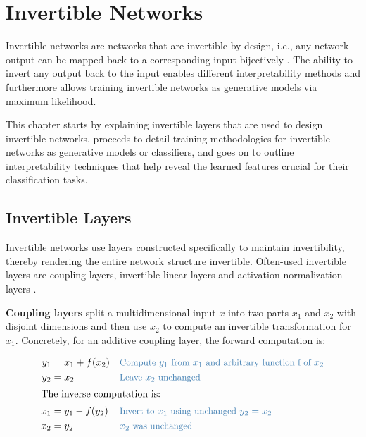 \chapter{Invertible Networks}\label{invertible-networks}


Invertible networks are networks that are invertible by design, i.e.,
any network output can be mapped back to a corresponding input
bijectively \citep{DBLP:journals/corr/DinhKB14,DBLP:journals/corr/DinhSB16,DBLP:conf/nips/KingmaD18,DBLP:conf/icml/RezendeM15,DBLP:conf/icml/HoCSDA19}.
The ability to invert any output back to the input enables different
interpretability methods and furthermore allows training invertible
networks as generative models via maximum likelihood.

This chapter starts by explaining invertible layers that are used to
design invertible networks, proceeds to detail training methodologies
for invertible networks as generative models or classifiers, and goes on
to outline interpretability techniques that help reveal the learned
features crucial for their classification tasks.

\section{Invertible Layers}\label{invertible-layers}

    Invertible networks use layers constructed specifically to maintain
invertibility, thereby rendering the entire network structure
invertible. Often-used invertible layers are coupling layers, invertible
linear layers and activation normalization layers
\citep{DBLP:conf/nips/KingmaD18}.

\textbf{Coupling layers} split a multidimensional input $x$ into two
parts $x_1$ and $x_2$ with disjoint dimensions and then use $x_2$
to compute an invertible transformation for $x_1$. Concretely, for an
additive coupling layer, the forward computation is:


\begin{align*}
    y_1 &= x_1 + f(x_2) && \codecomment{\text{Compute } y_1 \text{ from } x_1 \text{ and arbitrary function f of } x_2} \\
    y_2 &= x_2 && \codecomment{\text{Leave } x_2 \text{ unchanged}} \\
\intertext{The inverse computation is:}
    x_1 &= y_1 - f(y_2) && \codecomment{\text{Invert to } x_1 \text{ using unchanged } y_2=x_2} \\
    x_2 &= y_2 &&  \codecomment{x_2 \text{ was unchanged}}\\
\end{align*}

